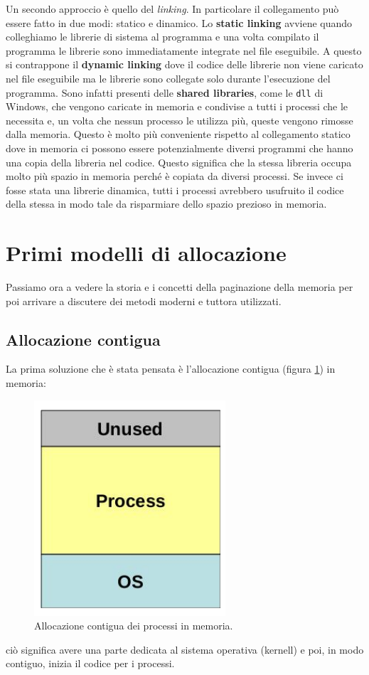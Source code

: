 Un secondo approccio è quello del \textit{linking}. In particolare il collegamento può essere fatto in due modi: statico e dinamico. Lo \textbf{static linking} avviene quando colleghiamo le librerie di sistema al programma e una volta compilato il programma le librerie sono immediatamente integrate nel file eseguibile. A questo si contrappone il \textbf{dynamic linking} dove il codice delle librerie non viene caricato nel file eseguibile ma le librerie sono collegate solo durante l'esecuzione del programma. Sono infatti presenti delle \textbf{shared libraries}, come le \texttt{dll} di Windows, che vengono caricate in memoria e condivise a tutti i processi che le necessita e, un volta che nessun processo le utilizza più, queste vengono rimosse dalla memoria. Questo è molto più conveniente rispetto al collegamento statico dove in memoria ci possono essere potenzialmente diversi programmi che hanno una copia della libreria nel codice. Questo significa che la stessa libreria occupa molto più spazio in memoria perché è copiata da diversi processi. Se invece ci fosse stata una librerie dinamica, tutti i processi avrebbero usufruito il codice della stessa in modo tale da risparmiare dello spazio prezioso in memoria.

% 
\section{Primi modelli di allocazione}
Passiamo ora a vedere la storia e i concetti della paginazione della memoria per poi arrivare a discutere dei metodi moderni e tuttora utilizzati.

% 
\subsection{Allocazione contigua}
La prima soluzione che è stata pensata è l'allocazione contigua (figura \ref{fig:memory_contiguos_allocation}) in memoria: 
\begin{figure}[h]
    \centering
    \includegraphics[width = .15\textwidth]{../res/imgs/main memory/contiguos_allocation.png}
    \caption{Allocazione contigua dei processi in memoria.}
    \label{fig:memory_contiguos_allocation}
\end{figure}
ciò significa avere una parte dedicata al sistema operativa (kernell) e poi, in modo contiguo, inizia il codice per i processi.


